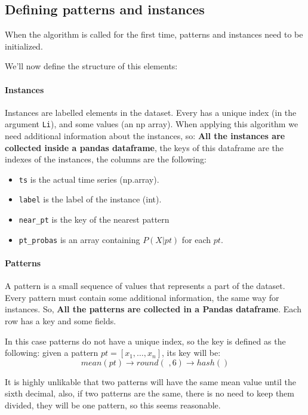 \subsection{Defining patterns and instances}
When the algorithm is called for the first time, patterns and instances need to be initialized.

We'll now define the structure of this elements:

\paragraph{Instances}
Instances are labelled elements in the dataset. Every has a unique index (in the argument \texttt{Li}), and some 
values (an np array). When applying this algorithm we need additional information about the instances, so:
\textbf{All the instances are collected inside a pandas dataframe}, the keys of this dataframe are the indexes of 
the instances, the columns are the following:

\begin{itemize}
    \item \texttt{ts} is the actual time series (np.array).
    \item \texttt{label} is the label of the instance (int).
    \item \texttt{near\_pt} is the key of the nearest pattern
    \item \texttt{pt\_probas} is an array containing $P(X | pt)$ for each $pt$.
\end{itemize}

\paragraph{Patterns}
A pattern is a small sequence of values that represents a part of the dataset. Every pattern must contain 
some additional information, the same way for instances. So, \textbf{All the patterns are collected in a 
Pandas dataframe}. Each row has a key and some fields.

In this case patterns do not have a unique index, so the key is defined as the following: given a pattern
$pt = [x_1, \dots, x_n]$, its key will be:
$$
    mean(pt) \longrightarrow round(\,\, ,6) \longrightarrow hash()
$$

It is highly unlikable that two patterns will have the same mean value until the sixth decimal, also, 
if two patterns are the same, there is no need to keep them divided, they will be one pattern, so 
this seems reasonable.

